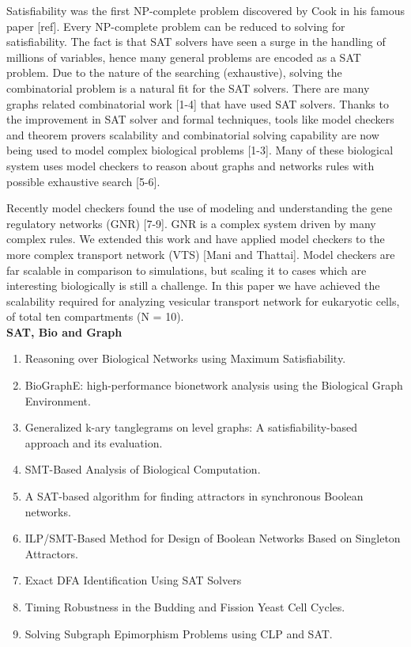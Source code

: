 
Satisfiability was the first NP-complete problem discovered by Cook in his famous paper [ref]. Every NP-complete problem can be reduced to solving for satisfiability. The fact is that SAT solvers have seen a surge in the handling of millions of variables, hence many general problems are encoded as a SAT problem. Due to the nature of the searching (exhaustive), solving the combinatorial problem is a natural fit for the SAT solvers. There are many graphs related combinatorial work [1-4] that have used SAT solvers. Thanks to the improvement in SAT solver and formal techniques, tools like model checkers and theorem provers scalability and combinatorial solving capability are now being used to model complex biological problems [1-3].
Many of these biological system uses model checkers to reason about graphs and networks rules with possible exhaustive search [5-6].  

Recently model checkers found the use of modeling and understanding the gene regulatory networks (GNR) [7-9]. GNR is a complex system driven by many complex rules. We extended this work and have applied model checkers to the more complex transport network (VTS) [Mani and Thattai]. Model checkers are far scalable in comparison to simulations, but scaling it to cases which are interesting biologically is still a challenge. In this paper we have achieved the scalability required for analyzing vesicular transport network for eukaryotic cells, of total ten compartments (N = 10). \\


\textbf{SAT, Bio and Graph}
\begin{enumerate}
\item Reasoning over Biological Networks using Maximum Satisfiability.
\item BioGraphE: high-performance bionetwork analysis using the Biological Graph Environment.
\item Generalized k-ary tanglegrams on level graphs: A satisfiability-based approach and its evaluation.
\item SMT-Based Analysis of Biological Computation.
\item A SAT-based algorithm for finding attractors in synchronous Boolean networks.
\item ILP/SMT-Based Method for Design of Boolean Networks Based on Singleton Attractors.
\item Exact DFA Identification Using SAT Solvers
\item Timing Robustness in the Budding and Fission Yeast Cell Cycles.
\item Solving Subgraph Epimorphism Problems using CLP
and SAT.
\end{enumerate}

